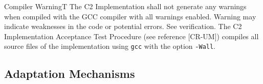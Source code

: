 \documentclass{pnp_article}
\begin{document}
\begin{fwReq}{Compiler Warning}{T}
{The C2 Implementation shall not generate any warnings when compiled with the GCC compiler with all warnings enabled.}
{Warning may indicate weaknesses in the code or potential errors.}
{See verification.} 
{The C2 Implementation Acceptance Test Procedure (see reference [CR-UM]) compiles all source files of the implementation using \texttt{gcc} with the option \texttt{-Wall}.}
\end{fwReq}


\subsection{Adaptation Mechanisms}\label{req:adaptationMechanisms}
\end{document}
